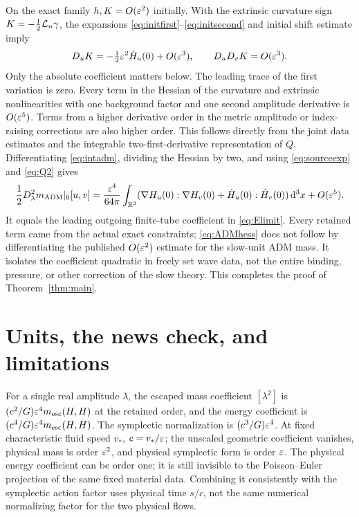On the exact family \(h,K=O(\varepsilon^2)\) initially. With the extrinsic curvature sign \(K=-\tfrac12\mathcal L_n\gamma\), the expansions \eqref{eq:initfirst}--\eqref{eq:initsecond} and initial shift estimate imply
\[
       D_u K=-\tfrac12\varepsilon^2\dot H_u(0)+O(\varepsilon^3),\qquad
       D_uD_vK=O(\varepsilon^3).
\]
Only the absolute coefficient matters below. The leading trace of the first variation is zero. Every term in the Hessian of the curvature and extrinsic nonlinearities with one background factor and one second amplitude derivative is \(O(\varepsilon^5)\). Terms from a higher derivative order in the metric amplitude or index-raising corrections are also higher order. This follows directly from the joint data estimates and the integrable two-first-derivative representation of \(Q\). Differentiating \eqref{eq:intadm}, dividing the Hessian by two, and using \eqref{eq:sourceexp} and \eqref{eq:Q2} gives
\begin{equation}
 \frac12D^2_\lambda m_{\mathrm{ADM}}|_0[u,v]
   =\frac{\varepsilon^4}{64\pi}\int_{\mathbb R^3}
       (\nabla H_u(0):\nabla H_v(0)+\dot H_u(0):\dot H_v(0))\,\mathrm d^3x
       +O(\varepsilon^5).
 \label{eq:ADMhess}
\end{equation}
It equals the leading outgoing finite-tube coefficient in \eqref{eq:Elimit}. Every retained term came from the actual exact constraints; \eqref{eq:ADMhess} does not follow by differentiating the published \(O(\varepsilon^2)\) estimate for the slow-unit ADM mass. It isolates the coefficient quadratic in freely set wave data, not the entire binding, pressure, or other correction of the slow theory. This completes the proof of Theorem~\ref{thm:main}.

\section{Units, the news check, and limitations}

For a single real amplitude \(\lambda\), the escaped mass coefficient \([\lambda^2]\) is
\((c^2/G)\varepsilon^4m_{\mathrm{esc}}(H,H)\) at the retained order, and the energy coefficient is \((c^4/G)\varepsilon^4m_{\mathrm{esc}}(H,H)\). The symplectic normalization is \((c^3/G)\varepsilon^4\). At fixed characteristic fluid speed \(v_*\), \(c=v_*/\varepsilon\); the unscaled geometric coefficient vanishes, physical mass is order \(\varepsilon^2\), and physical symplectic form is order \(\varepsilon\). The physical energy coefficient can be order one; it is still invisible to the Poisson--Euler projection of the same fixed material data. Combining it consistently with the symplectic action factor uses physical time \(s/c\), not the same numerical normalizing factor for the two physical flows.


